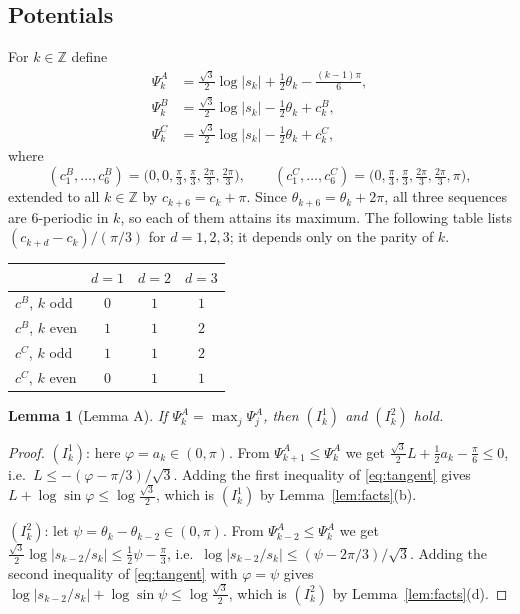 \documentclass[11pt]{amsart}
\newtheorem{lemma}[theorem]{Lemma}
\theoremstyle{definition}
\theoremstyle{remark}
\newcommand{\Z}{\mathbb{Z}}
\newcommand{\sq}{\tfrac{\sqrt3}{2}}
\begin{document}
\subsection{Potentials}
For $k\in\Z$ define
\begin{align*}
\Psi^A_k&=\tfrac{\sqrt3}{2}\log\lvert s_k\rvert+\tfrac12\theta_k-\tfrac{(k-1)\pi}{6},\\
\Psi^B_k&=\tfrac{\sqrt3}{2}\log\lvert s_k\rvert-\tfrac12\theta_k+c^B_k,\\
\Psi^C_k&=\tfrac{\sqrt3}{2}\log\lvert s_k\rvert-\tfrac12\theta_k+c^C_k,
\end{align*}
where
\[
(c^B_1,\dots,c^B_6)=\bigl(0,0,\tfrac\pi3,\tfrac\pi3,\tfrac{2\pi}3,\tfrac{2\pi}3\bigr),\qquad
(c^C_1,\dots,c^C_6)=\bigl(0,\tfrac\pi3,\tfrac\pi3,\tfrac{2\pi}3,\tfrac{2\pi}3,\pi\bigr),
\]
extended to all $k\in\Z$ by $c_{k+6}=c_k+\pi$. Since $\theta_{k+6}=\theta_k+2\pi$, all three sequences are $6$-periodic in $k$, so each of them attains its maximum. The following table lists $(c_{k+d}-c_k)/(\pi/3)$ for $d=1,2,3$; it depends only on the parity of $k$.
\begin{center}
\begin{tabular}{lccc}
\toprule
 & $d=1$ & $d=2$ & $d=3$\\
\midrule
$c^B$, $k$ odd & $0$ & $1$ & $1$\\
$c^B$, $k$ even & $1$ & $1$ & $2$\\
$c^C$, $k$ odd & $1$ & $1$ & $2$\\
$c^C$, $k$ even & $0$ & $1$ & $1$\\
\bottomrule
\end{tabular}
\end{center}

\begin{lemma}[Lemma A]\label{lem:A}
If $\Psi^A_k=\max_j\Psi^A_j$, then $(I^1_k)$ and $(I^2_k)$ hold.
\end{lemma}

\begin{proof}
$(I^1_k)$: here $\varphi=a_k\in(0,\pi)$. From $\Psi^A_{k+1}\le\Psi^A_k$ we get $\frac{\sqrt3}{2}L+\frac12a_k-\frac\pi6\le0$, i.e.\ $L\le-(\varphi-\pi/3)/\sqrt3$. Adding the first inequality of \eqref{eq:tangent} gives $L+\log\sin\varphi\le\log\sq$, which is $(I^1_k)$ by Lemma~\ref{lem:facts}(b).

$(I^2_k)$: let $\psi=\theta_k-\theta_{k-2}\in(0,\pi)$. From $\Psi^A_{k-2}\le\Psi^A_k$ we get $\frac{\sqrt3}{2}\log\lvert s_{k-2}/s_k\rvert\le\frac12\psi-\frac\pi3$, i.e.\ $\log\lvert s_{k-2}/s_k\rvert\le(\psi-2\pi/3)/\sqrt3$. Adding the second inequality of \eqref{eq:tangent} with $\varphi=\psi$ gives $\log\lvert s_{k-2}/s_k\rvert+\log\sin\psi\le\log\sq$, which is $(I^2_k)$ by Lemma~\ref{lem:facts}(d).
\end{proof}
\end{document}
